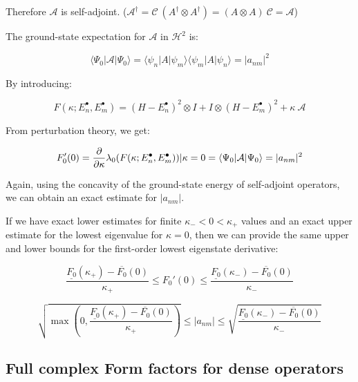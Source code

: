 \documentclass{article}
\theoremstyle{definition}
\begin{document}
Therefore $\mathcal{A}$ is self-adjoint. ($\mathcal{A}^\dagger = \mathcal{C} \ (A^\dagger \otimes A^\dagger) = (A \otimes A) \ \mathcal{C} = \mathcal{A}$)

The ground-state expectation for $\mathcal{A}$ in $\mathcal{H}^2$ is:

\begin{equation}
\langle\Psi_0| \mathcal{A} |\Psi_0\rangle
=
\langle\psi_n | A | \psi_m \rangle \langle\psi_m | A | \psi_n \rangle
=
|a_{nm}|^2
\end{equation}

By introducing:

\begin{equation}
F(\kappa;E_n^\bullet,E_m^\bullet) =
(H-E_n^\bullet)^2 \otimes I + I \otimes (H-E_m^\bullet)^2
+
\kappa \ \mathcal{A}
\end{equation}

From perturbation theory, we get:

\begin{equation}
F'_0(0) =
\frac{\partial}{\partial \kappa} \lambda_0(F(\kappa;E_n^\bullet, E_m^\bullet)) {\Large |}{\kappa=0}
=
\langle\Psi_0| \mathcal{A} |\Psi_0\rangle = |a_{nm}|^2
\end{equation}

Again, using the concavity of the ground-state energy of self-adjoint operators, we can obtain an exact estimate for $|a_{nm}|$.

If we have exact lower estimates for finite $\kappa_- < 0 < \kappa_+$ values and an exact upper estimate for the lowest eigenvalue for $\kappa=0$, then we can provide the same upper and lower bounds for the first-order lowest eigenstate derivative:

\begin{equation}
\frac{\underline{F_0}(\kappa_+) - \overline{F_0}(0)}{\kappa_+}
\le
F_0'(0)
\le
\frac{\underline{F_0}(\kappa_-) - \overline{F_0}(0)}{\kappa_-}
\end{equation}

\begin{equation}
\sqrt{\max \left ( 0,\frac{\underline{F_0}(\kappa_+) - \overline{F_0}(0)}{\kappa_+} \right )}
\le
|a_{nm}|
\le
\sqrt{
\frac{\underline{F_0}(\kappa_-) - \overline{F_0}(0)}{\kappa_-}}
\end{equation}
\subsection{Full complex Form factors for dense operators}
\end{document}
